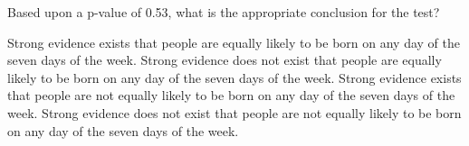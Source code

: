 \documentclass{article}
\begin{document}
\begin{mcquestions}
		\question[follow] Based upon a p-value of 0.53, what is the appropriate conclusion for the test? \label{birthday-2}
		\begin{mcanswerslist}
			\answer  Strong evidence exists that people are equally likely to be born on any day of the seven days of the week.
			\answer  Strong evidence does not exist that people are equally likely to be born on any day of the seven days of the week.
			\answer  Strong evidence exists that people are not equally likely to be born on any day of the seven days of the week.
			\answer[correct]  Strong evidence does not exist that people are not equally likely to be born on any day of the seven days of the week.
		\end{mcanswerslist}
		
		
	\end{mcquestions}
\end{document}
